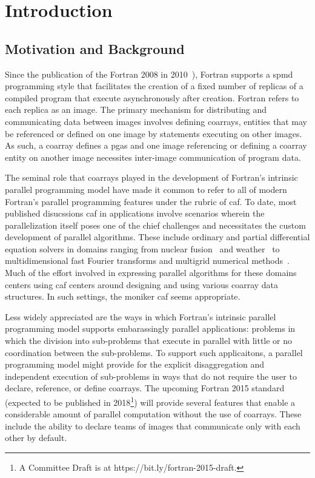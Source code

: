 \section{Introduction}
\subsection{Motivation and Background}
Since the publication of the Fortran 2008 in 2010~\cite{iso2010information}), Fortran supports a \gls{spmd} programming style
that facilitates the creation of a fixed number of replicas of a compiled program that execute asynchronously after creation.
Fortran refers to each replica as an image.  The primary mechanism for distributing and communicating data between
images involves defining \glspl{coarray}, entities that may be referenced or defined on one image by statements executing on
other images. As such, a coarray defines a \gls{pgas} and one image referencing or defining a coarray entity on another image
necessites inter-image communication of program data.

The seminal role that \glspl{coarray} played in the development of Fortran's intrinsic parallel programming model have made it
common to refer to all of modern Fortran's parallel programming features under the rubric of \gls{caf}.  To date, most
published disucssions \gls{caf} in applications involve scenarios wherein the parallelization itself poses one of the chief
challenges and necessitates the custom development of parallel algorithms.  These include ordinary and partial differential
equation solvers in domains ranging from nuclear fusion~\cite{preissl2011multithreaded} and
weather~\cite{mozdzynski2015partitioned} to multidimensional fast Fourier transforms and multigrid numerical
methods~\cite{garain2015comparing}.  Much of the effort involved in expressing parallel algorithms for these domains centers
 using \gls{caf} centers around designing and using various \gls{coarray} data structures.  In such settings, the moniker
\gls{caf} seems appropriate.

Less widely appreciated are the ways in which Fortran's intrinsic parallel programming model supports embarassingly parallel
applications: problems in which the division into sub-problems that execute in parallel with little or no coordination between
the sub-problems.  To support such applicaitons, a parallel programming model might provide for the explicit disaggregation
and independent execution of sub-problems in ways that do not require the user to declare, reference, or define \glspl{coarray}.
The upcoming Fortran 2015 standard (expected to be published in 2018\footnote{A Committee Draft is at
https://bit.ly/fortran-2015-draft.}) will provide several features that enable a considerable amount of parallel computation
without the use of \glspl{coarray}.  These include the ability to declare teams of images that communicate only with each
other by default.

